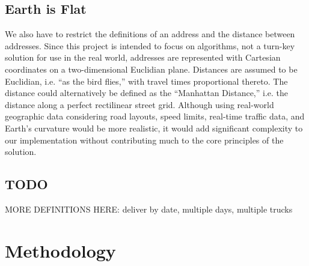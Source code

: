 \documentclass[letterpaper]{article}
\begin{document}
    \subsection{Earth is Flat}
    \label{subection:Earth_is_Flat}
    We also have to restrict the definitions of an address and the distance between addresses. Since this project is intended to focus on algorithms, not a turn-key solution for use in the real world, addresses are represented with Cartesian coordinates on a two-dimensional Euclidian plane. Distances are assumed to be Euclidian, i.e. ``as the bird flies,'' with travel times proportional thereto. The distance could alternatively be defined as the ``Manhattan Distance,'' i.e. the distance along a perfect rectilinear street grid. Although using real-world geographic data considering road layouts, speed limits, real-time traffic data, and Earth's curvature would be more realistic, it would add significant complexity to our implementation without contributing much to the core principles of the solution.

    \subsection{TODO}
    MORE DEFINITIONS HERE: deliver by date, multiple days, multiple trucks

    \section{Methodology}
    \label{section:Methodology}
\end{document}
